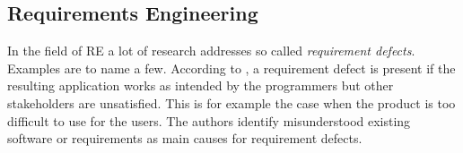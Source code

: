 


\subsection{Requirements Engineering}
\label{chp:fundamentals:sec:vagueness:subsec:requirement_engineering}
In the field of \ac{RE} a lot of research addresses so called \textit{requirement defects}.
Examples are \textcite{Lauesen:2001,Kosman:1997,Blackburn:2001} to name a few.
According to \textcite{Lauesen:2001}, a requirement defect is present if the resulting application works as intended by the programmers but other stakeholders are unsatisfied.
This is for example the case when the product is too difficult to use for the users.
The authors identify misunderstood existing software or requirements as main causes for requirement defects.

